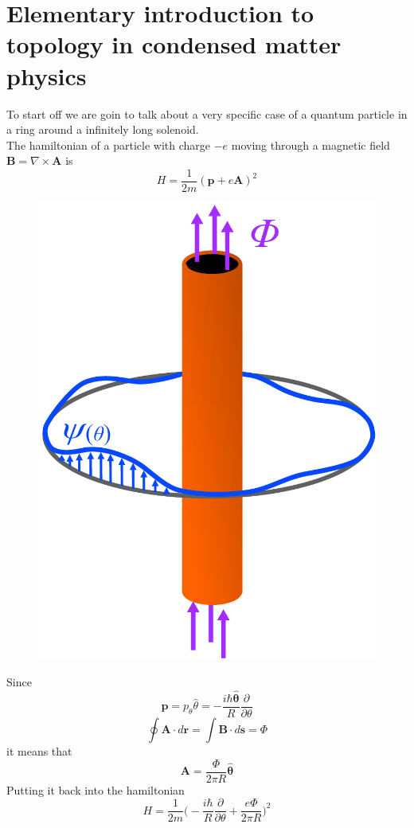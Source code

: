 \label{sec:no_flat}


\section{Elementary introduction to topology in condensed matter physics}
    
        
        To start off we are goin to talk about a very specific case of a quantum particle in a ring around a infinitely long solenoid.\\
        The hamiltonian of a particle with charge $-e$ moving through a magnetic field $\mathbf B= \nabla \times \mathbf A$ is
        \begin{equation} \label{EMHamiltonian}
                H=\frac 1{2m}(\mathbf p + e\mathbf A)^2 
        \end{equation}
        \begin{figure}
            \includegraphics[width=.4\textwidth]{Immagini/topo/solenoid.pdf}
        \end{figure} 
        Since 
        \[\mathbf p=p_\theta \hat\theta=-\frac{i\hbar\mathbf {\hat \theta}}{R}\frac\partial {\partial \theta}\]
        \[
            \oint \mathbf A\cdot d\mathbf r=\int \mathbf B\cdot d\mathbf s = \Phi
        \]   
        it means that
        \begin{equation} \label{vector_potential}
            \mathbf A=\frac \Phi{2\pi R} \mathbf {\hat \theta}
        \end{equation}
        Putting it back into the hamiltonian
        \begin{equation} \label{EMHamiltonian2}
            H=\frac 1{2m}\bigg(-\frac{i\hbar}{R}\frac\partial {\partial \theta} + \frac{e\Phi}{2\pi R}\bigg)^2 
        \end{equation}
